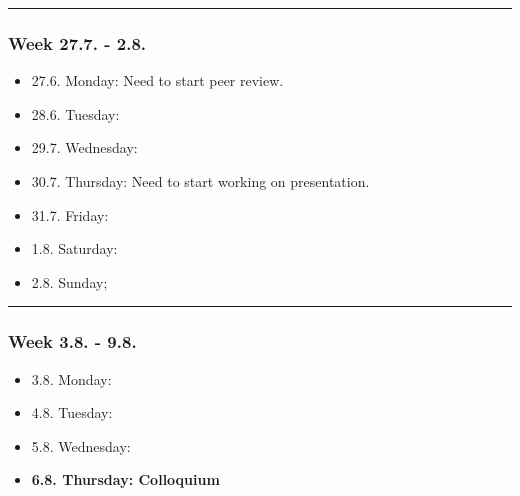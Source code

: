 \hrule
\subsubsection*{Week 27.7. - 2.8.}
\begin{itemize}
  \item 27.6. Monday: Need to start peer review.
  \item 28.6. Tuesday:
  \item 29.7. Wednesday:
  \item 30.7. Thursday: Need to start working on presentation.
  \item 31.7. Friday:
  \item  1.8. Saturday:
  \item  2.8. Sunday;
\end{itemize}

\hrule
\subsubsection*{Week 3.8. - 9.8.}
\begin{itemize}
  \item  3.8. Monday:
  \item  4.8. Tuesday:
  \item  5.8. Wednesday:
  \item \textbf{6.8. Thursday: Colloquium}
\end{itemize}
